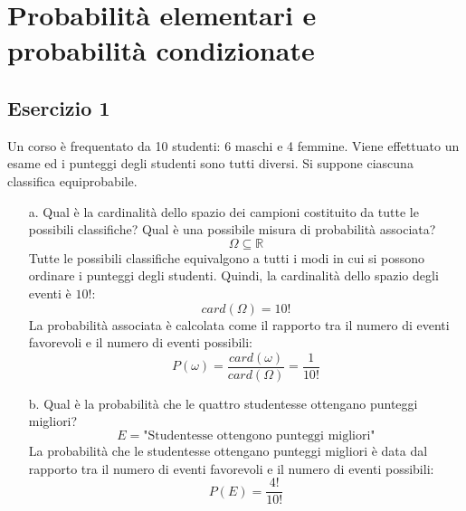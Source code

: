 \documentclass[a4paper]{article}
\theoremstyle{break}
\theoremstyle{break}
\theoremstyle{break}
\theoremstyle{break}
\begin{document}


\tableofcontents
\pagebreak

\section{Probabilità elementari e probabilità condizionate}
\subsection{Esercizio 1}
Un corso è frequentato da 10 studenti: 6 maschi e 4 femmine. Viene effettuato un
esame ed i punteggi degli studenti sono tutti diversi. Si suppone ciascuna classifica
equiprobabile.
\begin{enumerate}
	\item[a.] Qual è la cardinalità dello spazio dei campioni costituito da tutte le
	      possibili classifiche? Qual è una possibile misura di probabilità associata?
	      \[
		      \Omega \subseteq \mathbb{R}
	      \]
	      Tutte le possibili classifiche equivalgono a tutti i modi in cui si possono
	      ordinare i punteggi degli studenti. Quindi, la cardinalità dello spazio degli
	      eventi è $10!$:
	      \[
		      card(\Omega) = 10!
	      \]
	      La probabilità associata è calcolata come il rapporto tra il numero di eventi
	      favorevoli e il numero di eventi possibili:
	      \[
		      P(\omega) = \frac{card(\omega)}{card(\Omega)} = \frac{1}{10!}
	      \]
	\item[b.] Qual è la probabilità che le quattro studentesse ottengano punteggi migliori?
	      \[
		      E = \text{"Studentesse ottengono punteggi migliori"}
	      \]
	      La probabilità che le studentesse ottengano punteggi migliori è data dal rapporto
	      tra il numero di eventi favorevoli e il numero di eventi possibili:
	      \[
		      P(E) = \frac{4!}{10!}
	      \]
\end{enumerate}
\end{document}
